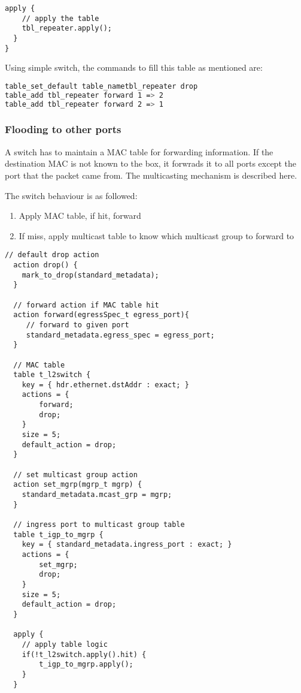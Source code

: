 \documentclass[a4paper, fontsize=8pt, landscape, DIV=1]{scrartcl}
\begin{document}
\begin{multicols*}{3}
\begin{lstlisting}[style=P4style]
  apply {
    // apply the table
    tbl_repeater.apply();
  }
}\end{lstlisting}

  Using simple switch, the commands to fill this table as mentioned are:

  \begin{lstlisting}[language=bash]
table_set_default table_nametbl_repeater drop
table_add tbl_repeater forward 1 => 2
table_add tbl_repeater forward 2 => 1\end{lstlisting}

  \subsubsection{Flooding to other ports}
  A switch has to maintain a MAC table for forwarding information. If the destination MAC is not known to the box, it forwrads it to all ports except the port that the packet came from. The multicasting mechanism is described here.

  The switch behaviour is as followed:
  \begin{enumerate}
    \item Apply MAC table, if hit, forward
    \item If miss, apply multicast table to know which multicast group to forward to
  \end{enumerate}

  \begin{lstlisting}[style=P4style]
  // default drop action
  action drop() {
    mark_to_drop(standard_metadata);
  }

  // forward action if MAC table hit
  action forward(egressSpec_t egress_port){
     // forward to given port
     standard_metadata.egress_spec = egress_port;
  }

  // MAC table
  table t_l2switch {
    key = { hdr.ethernet.dstAddr : exact; }
    actions = {
        forward;
        drop;
    }
    size = 5;
    default_action = drop;
  }

  // set multicast group action
  action set_mgrp(mgrp_t mgrp) {
    standard_metadata.mcast_grp = mgrp;
  }

  // ingress port to multicast group table
  table t_igp_to_mgrp {
    key = { standard_metadata.ingress_port : exact; }
    actions = {
        set_mgrp;
        drop;
    }
    size = 5;
    default_action = drop;
  }

  apply {
    // apply table logic
    if(!t_l2switch.apply().hit) {
        t_igp_to_mgrp.apply();
    }
  }\end{lstlisting}


\end{multicols*}
\end{document}
